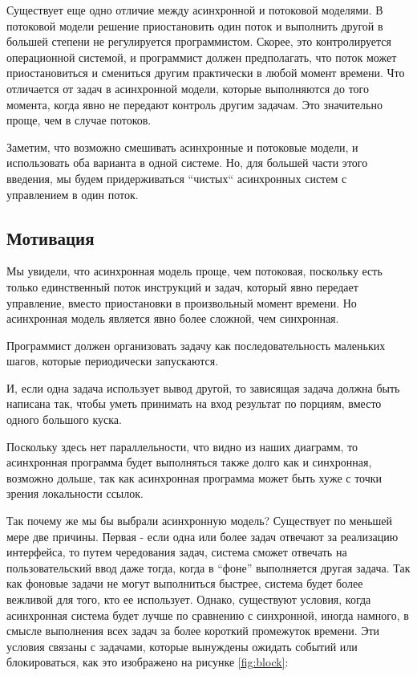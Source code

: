Существует еще одно отличие между асинхронной и потоковой моделями.
В потоковой модели решение приостановить один поток и выполнить другой
в большей степени не регулируется программистом. Скорее, это контролируется
операционной системой, и программист должен предполагать, что поток
может приостановиться и смениться другим практически в любой момент времени.
Что отличается от задач в асинхронной модели, которые выполняются до того момента,
когда явно не передают контроль другим задачам. Это значительно проще, чем
в случае потоков.


Заметим, что возможно смешивать асинхронные и потоковые модели, и использовать
оба варианта в одной системе. Но, для большей части этого введения,
мы будем придерживаться ``чистых`` асинхронных систем с управлением в один поток.


\subsection{Мотивация}


    Мы увидели, что асинхронная модель проще, чем потоковая, поскольку 
есть только единственный поток инструкций и задач, который явно передает 
управление, вместо приостановки в произвольный момент времени. Но 
асинхронная модель является явно более сложной, чем синхронная. 


Программист должен организовать задачу как последовательность 
маленьких шагов, которые периодически запускаются.


И, если одна задача использует вывод другой, то зависящая 
задача должна быть написана так, чтобы уметь принимать на вход  
результат по порциям, вместо одного большого куска.


Поскольку здесь нет параллельности, что видно из 
наших диаграмм, то асинхронная программа будет 
выполняться также долго как и синхронная, возможно дольше, 
так как асинхронная программа может быть
хуже с точки зрения локальности ссылок.


Так почему же мы бы выбрали асинхронную модель? 
Существует по меньшей мере две причины. 
Первая - если одна или более задач отвечают за реализацию интерфейса, 
то путем чередования задач, система сможет отвечать 
на пользовательский ввод даже тогда, когда в ``фоне'' выполняется 
другая задача. Так как фоновые задачи не могут выполниться быстрее, 
система будет более вежливой для того, кто ее использует. 
Однако, существуют условия, когда асинхронная система 
будет лучше по сравнению с синхронной, иногда намного, в смысле 
выполнения всех задач за более короткий промежуток времени.
Эти условия связаны с задачами, которые вынуждены ожидать событий 
или блокироваться, как это изображено на рисунке \ref{fig:block}: 

